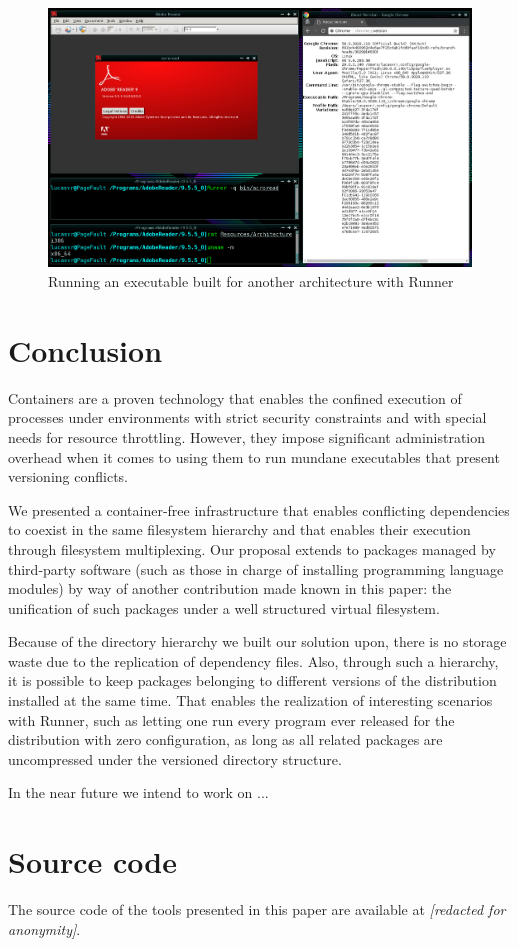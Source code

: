 \documentclass[sigplan, anonymous, 10pt]{acmart}
\begin{document}
\begin{figure}[!ht]
    \centering
    \includegraphics[width=.75\textwidth]{Runner.png}
    \caption{Running an executable built for another architecture with Runner}
    \label{fig:runner}
\end{figure}

\section{Conclusion}\label{sec:conclusion}
Containers are a proven technology that enables the confined execution of
processes under environments with strict security constraints and with special
needs for resource throttling. However, they impose significant administration
overhead when it comes to using them to run mundane executables that present
versioning conflicts.

We presented a container-free infrastructure that enables conflicting
dependencies to coexist in the same filesystem hierarchy and that enables
their execution through filesystem multiplexing. Our proposal extends to
packages managed by third-party software (such as those in charge of
installing programming language modules) by way of another contribution
made known in this paper: the unification of such packages under a well
structured virtual filesystem.

Because of the directory hierarchy we built our solution upon, there is
no storage waste due to the replication of dependency files. Also, through
such a hierarchy, it is possible to keep packages belonging to different
versions of the distribution installed at the same time. That enables the
realization of interesting scenarios with Runner, such as letting one run
every program ever released for the distribution with zero configuration,
as long as all related packages are uncompressed under the versioned
directory structure.

In the near future we intend to work on ...

\section{Source code}
The source code of the tools presented in this paper are available at
\emph{[redacted for anonymity]}.



\end{document}
